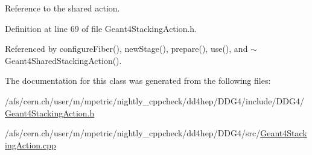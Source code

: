 Reference to the shared action. 

Definition at line 69 of file Geant4StackingAction.h.

Referenced by configureFiber(), newStage(), prepare(), use(), and $\sim$Geant4SharedStackingAction().

The documentation for this class was generated from the following files:\begin{DoxyCompactItemize}
\item 
/afs/cern.ch/user/m/mpetric/nightly\_\-cppcheck/dd4hep/DDG4/include/DDG4/\hyperlink{_geant4_stacking_action_8h}{Geant4StackingAction.h}\item 
/afs/cern.ch/user/m/mpetric/nightly\_\-cppcheck/dd4hep/DDG4/src/\hyperlink{_geant4_stacking_action_8cpp}{Geant4StackingAction.cpp}\end{DoxyCompactItemize}
